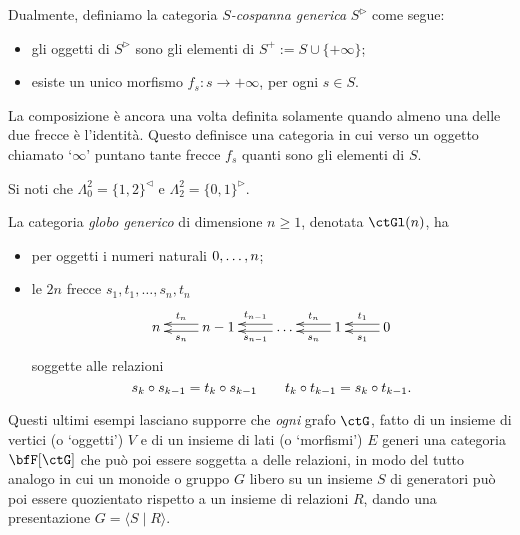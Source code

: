 \begin{example}
	Dualmente, definiamo la categoria \emph{\(S\)-cospanna generica} \(S^\rhd\) come segue:
	\begin{itemize}
		\item gli oggetti di \(S^\rhd\) sono gli elementi di \(S^+ := S\cup \{+\infty\}\);
		\item esiste un unico morfismo \(f_s : s\to+\infty\), per ogni \(s\in S\).
	\end{itemize}
	La composizione è ancora una volta definita solamente quando almeno una delle due frecce è l'identità. Questo definisce una categoria in cui verso un oggetto chiamato `\(\infty\)' puntano tante frecce \(f_s\) quanti sono gli elementi di \(S\).

	Si noti che \(\Lambda^2_0=\{1,2\}^\lhd\) e \(\Lambda^2_2=\{0,1\}^\rhd\).
\end{example}
\begin{example}
	\label{ex_globo}
	La categoria \emph{globo generico} di dimensione \(n\ge 1\), denotata \(\ctGl(n)\), ha
	\begin{itemize}
		\item per oggetti i numeri naturali \(\iter[0]n\);
		\item le \(2n\) frecce \(s_1,t_1,\dots,s_n,t_n\)
		      \[\xymatrix{
			      n &\ar@<.25em>[l]^-{s_n}\ar@<-.25em>[l]_-{t_n} n-1 &\ar@<.25em>[l]^-{s_{n-1}}\ar@<-.25em>[l]_-{t_{n-1}} \dots &\ar@<.25em>[l]^-{s_n}\ar@<-.25em>[l]_-{t_n} 1 &\ar@<.25em>[l]^-{s_1}\ar@<-.25em>[l]_-{t_1} 0
			      }\]
		      soggette alle relazioni
		      \[s_k\circ s_{k-1} = t_k\circ s_{k-1}\qquad t_k\circ t_{k-1} = s_k\circ t_{k-1}.\]
	\end{itemize}
\end{example}
Questi ultimi esempi lasciano supporre che \emph{ogni} grafo \(\ctG\), fatto di un insieme di vertici (o `oggetti') \(V\) e di un insieme di lati (o `morfismi') \(E\) generi una categoria \(\bfF[\ctG]\) che può poi essere soggetta a delle relazioni, in modo del tutto analogo in cui un monoide o gruppo \(G\) libero su un insieme \(S\) di generatori può poi essere quozientato rispetto a un insieme di relazioni \(R\), dando una presentazione \(G = \langle S\mid R\rangle\).

